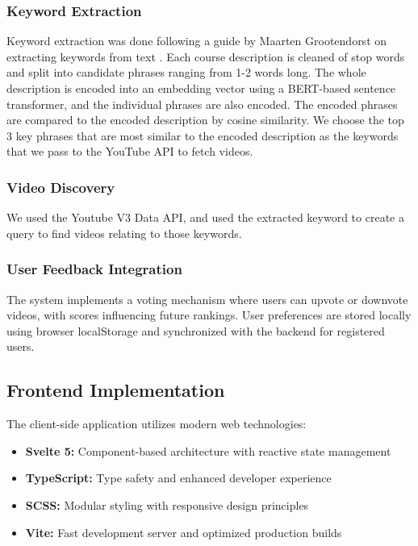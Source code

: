 \documentclass[manuscript,nonacm]{acmart}
\begin{document}
\subsubsection{Keyword Extraction}
Keyword extraction was done following a guide by Maarten Grootendorst on extracting keywords from text \cite{Grootendorst}. Each course description is cleaned of stop words and split into candidate phrases ranging from 1-2 words long. The whole description is encoded into an embedding vector using a BERT-based sentence transformer, and the individual phrases are also encoded. The encoded phrases are compared to the encoded description by cosine similarity. We choose the top 3 key phrases that are most similar to the encoded description as the keywords that we pass to the YouTube API to fetch videos.

\subsubsection{Video Discovery}
We used the Youtube V3 Data API, and used the extracted keyword to create a query to find videos relating to those keywords.


\subsubsection{User Feedback Integration}
The system implements a voting mechanism where users can upvote or downvote videos, with scores influencing future rankings. User preferences are stored locally using browser localStorage and synchronized with the backend for registered users.

\subsection{Frontend Implementation}

The client-side application utilizes modern web technologies:

\begin{itemize}
    \item \textbf{Svelte 5:} Component-based architecture with reactive state management
    \item \textbf{TypeScript:} Type safety and enhanced developer experience
    \item \textbf{SCSS:} Modular styling with responsive design principles
    \item \textbf{Vite:} Fast development server and optimized production builds
\end{itemize}
\end{document}
